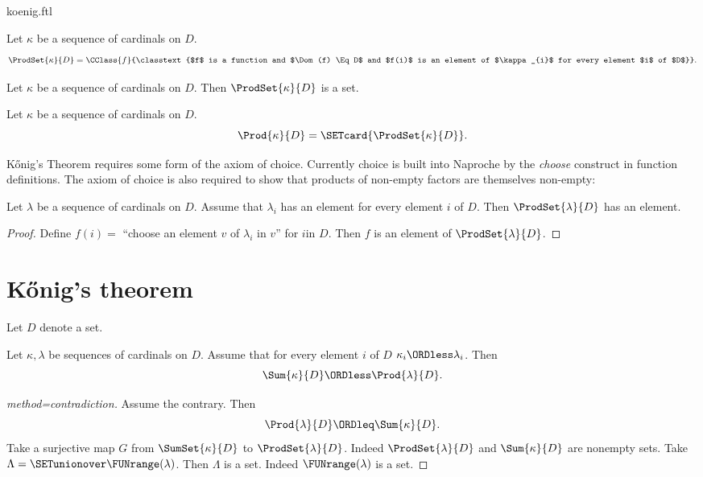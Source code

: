 \documentclass{stex}
\begin{document}
\begin{smodule}{koenig.ftl}
\begin{forthel}
  \begin{definition*}[for=ProdSet]
    Let $\kappa$ be a sequence of cardinals on $D$.
    \[ \ProdSet{\kappa}{D} = \CClass{f}{\classtext{$f$ is a function and $\Dom(f) \Eq D$ and $f(i)$ is an element of $\kappa_{i}$ for every element $i$ of $D$}}. \]
  \end{definition*}

  \begin{axiom*}
    Let $\kappa$ be a sequence of cardinals on $D$.
    Then $\ProdSet{\kappa}{D}$ is a set.
  \end{axiom*}

  \begin{definition*}[for=Prod]
    Let $\kappa$ be a sequence of cardinals on $D$.
    \[ \Prod{\kappa}{D} = \SETcard{ \ProdSet{\kappa}{D} }. \]
  \end{definition*}
\end{forthel}

Kőnig's Theorem requires some form of the axiom of choice.
Currently choice is built into Naproche by the \emph{choose} construct in
function definitions.
The axiom of choice is also required to show that products of non-empty factors
are themselves non-empty:

\begin{forthel}
  \begin{lemma*}[title=Choice]
    Let $\lambda$ be a sequence of cardinals on $D$.
    Assume that $\lambda_{i}$ has an element for every element $i$ of $D$.
    Then $\ProdSet{\lambda}{D}$ has an element.
  \end{lemma*}
  \begin{proof}
    Define $f(i) =$ ``choose an element $v$ of $\lambda_{i}$ in $v$'' for $i$in $D$.
    Then $f$ is an element of $\ProdSet{\lambda}{D}$.
  \end{proof}
\end{forthel}


\section*{Kőnig's theorem}

\begin{forthel}
  Let $D$ denote a set.

  \begin{theorem*}[title=Kőnig,name=Koenig]
    Let $\kappa, \lambda$ be sequences of cardinals on $D$.
    Assume that for every element $i$ of $D$ $\kappa_{i} \ORDless \lambda_{i}$.
    Then \[ \Sum{\kappa}{D} \ORDless \Prod{\lambda}{D}. \]
  \end{theorem*}
  \begin{proof}[method=contradiction]
    Assume the contrary.
    Then \[ \Prod{\lambda}{D} \ORDleq \Sum{\kappa}{D}. \]
    Take a surjective map $G$ from $\SumSet{\kappa}{D}$ to $\ProdSet{\lambda}{D}$.
    Indeed $\ProdSet{\lambda}{D}$ and $\Sum{\kappa}{D}$ are nonempty sets.
    Take $\Lambda = \SETunionover \FUNrange(\lambda)$.
    Then $\Lambda$ is a set.
    Indeed $\FUNrange(\lambda)$ is a set.


\end{proof}
\end{forthel}
\end{smodule}
\end{document}
